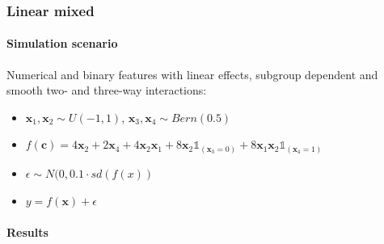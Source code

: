\subsubsection{Linear mixed}
\paragraph{Simulation scenario}
Numerical and binary features with linear effects, subgroup dependent and smooth two- and three-way interactions:
\begin{itemize}
    \item $\textbf{x}_1, \textbf{x}_2 \sim U(-1,1)$, $\textbf{x}_3, \textbf{x}_4 \sim Bern(0.5)$
    \item $f(\textbf{c}) = 4   \textbf{x}_2 + 2   \textbf{x}_4  + 4   \textbf{x}_2   \textbf{x}_1 + 8   \textbf{x}_2   \mathbb{1}_{(\textbf{x}_3 = 0)} +  8 \textbf{x}_1   \textbf{x}_2 \mathbb{1}_{(\textbf{x}_4 = 1)}$
    \item $\epsilon \sim N(0, 0.1 \cdot sd(f(x))$
    \item $y = f(\textbf{x}) + \epsilon$
\end{itemize}


\paragraph{Results}

